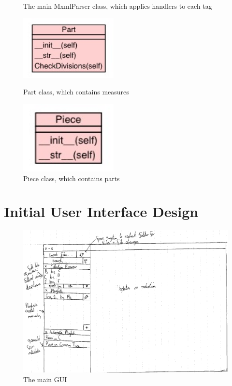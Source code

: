 \begin{appendices}
\begin{figure}[H]
\begin{minipage}{160pt}
\caption{The main MxmlParser class, which applies handlers to each tag}
\label{fig:mxmlparse}
\end{minipage}
\begin{minipage}{160pt}
\includegraphics[width=140pt]{diagrams/jpegs/uml_class_diagram_for_implemen_66}	
\caption{Part class, which contains measures}
\label{fig:partclass}
\end{minipage}
\begin{minipage}{160pt}
\includegraphics[width=140pt]{diagrams/jpegs/uml_class_diagram_for_implemen_67}	
\caption{Piece class, which contains parts}
\label{fig:piececlass}
\end{minipage}
\end{figure}
\section{Initial User Interface Design}
\begin{figure}[H]
	\centering
	\includegraphics[width=400pt]{designs/main}
	\caption{The main GUI}
	\label{fig:m}	
\end{figure}


\end{appendices}
